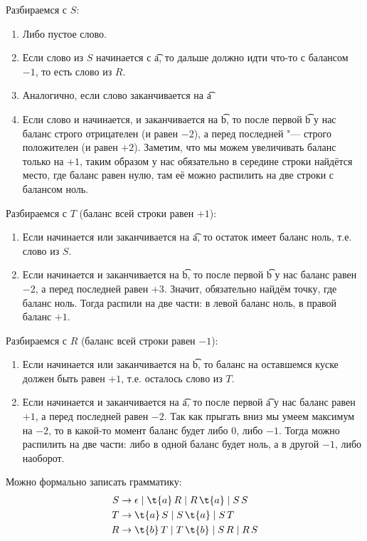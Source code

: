 	Разбираемся с $S$:
	\begin{enumerate}
		\item
			Либо пустое слово.
		\item
			Если слово из $S$ начинается с \t{a}, то дальше должно идти что-то с балансом $-1$,
			то есть слово из $R$.
		\item
			Аналогично, если слово заканчивается на \t{a}
		\item
			Если слово и начинается, и заканчивается на \t{b}, то после первой \t{b} у нас
			баланс строго отрицателен (и равен $-2$), а перед последней "--- строго положителен
			(и равен $+2$).
			Заметим, что мы можем увеличивать баланс только на $+1$, таким образом у нас обязательно
			в середине строки найдётся место, где баланс равен нулю, там её можно распилить
			на две строки с балансом ноль.
	\end{enumerate}
	Разбираемся с $T$ (баланс всей строки равен $+1$):
	\begin{enumerate}
		\item
			Если начинается или заканчивается на \t{a}, то остаток имеет баланс ноль, т.е. слово из $S$.
		\item
			Если начинается и заканчивается на \t{b}, то после первой \t{b} у нас
			баланс равен $-2$, а перед последней равен $+3$.
			Значит, обязательно найдём точку, где баланс ноль.
			Тогда распили на две части: в левой баланс ноль, в правой баланс $+1$.
	\end{enumerate}
	Разбираемся с $R$ (баланс всей строки равен $-1$):
	\begin{enumerate}
		\item
			Если начинается или заканчивается на \t{b}, то баланс на оставшемся куске должен быть равен $+1$,
			т.е. осталось слово из $T$.
		\item
			Если начинается и заканчивается на \t{a}, то после первой \t{a} у нас
			баланс равен $+1$, а перед последней равен $-2$.
			Так как прыгать вниз мы умеем максимум на $-2$, то в какой-то момент баланс будет
			либо $0$, либо $-1$.
			Тогда можно распилить на две части: либо в одной баланс будет ноль, а в другой $-1$,
			либо наоборот.
	\end{enumerate}
	Можно формально записать грамматику:
	\begin{align*}
		S &\to \epsilon \mid \t{a}\,R \mid R\,\t{a} \mid S\,S \\
		T &\to \t{a}\,S \mid S\,\t{a} \mid S\,T \\
		R &\to \t{b}\,T \mid T\,\t{b} \mid S\,R \mid R\,S
	\end{align*}

